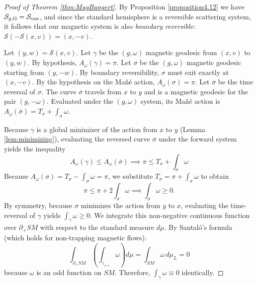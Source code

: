 \documentclass[12pt]{amsart}
\numberwithin{equation}{section}
\begin{document}
\begin{proof}[Proof of Theorem \ref{thm:MagBangert}] By Proposition \ref{proposition4.12} we have $\mathcal{S}_{g,\Omega} = \mathcal{S}_{\rm can}$, and since the standard hemisphere is a reversible scattering system, it follows that our magnetic system is also \emph{boundary reversible}: $\mathcal{S}(-\mathcal{S}(x,v)) = (x,-v)$.


Let $(y, w) = \mathcal{S}(x,v)$. Let $\gamma$ be the $(g,\omega)$ magnetic geodesic from $(x,v)$ to $(y,w)$. By hypothesis, $A_\omega(\gamma) = \pi$.
Let $\sigma$ be the $(g,\omega)$ magnetic geodesic starting from $(y, -w)$. By boundary reversibility, $\sigma$ must exit exactly at $(x, -v)$. By the hypothesis on the Ma\~n\'e action, $A_\omega(\sigma) = \pi$. Let $\overline{\sigma}$ be the time reversal of $\sigma$. The curve $\overline{\sigma}$ travels from $x$ to $y$ and is a magnetic geodesic for the pair $(g, -\omega)$. Evaluated under the
$(g, \omega)$ system, its Ma\~n\'e action is $A_\omega(\overline{\sigma}) = T_\sigma + \int_\sigma \omega$.

Because $\gamma$ is a global minimizer of the action from $x$ to $y$ (Lemma \ref{lem:minimizing}), evaluating the reversed curve $\overline{\sigma}$ under the forward system yields the inequality
\begin{equation*}
    A_\omega(\gamma) \le A_\omega(\overline{\sigma}) \implies \pi \le T_\sigma +\int_\sigma \omega
\end{equation*}
Because $A_\omega(\sigma) = T_\sigma - \int_\sigma \omega = \pi$, we substitute $T_\sigma = \pi +\int_\sigma \omega$ to obtain
\begin{equation*}
    \pi \le \pi +2\int_\sigma \omega \implies \int_\sigma \omega \geq 0.
\end{equation*}
By symmetry, because $\sigma$ minimizes the action from $y$ to $x$, evaluating the time-reversal of $\gamma$ yields $\int_\gamma \omega \geq 0$.
We integrate this non-negative continuous function over $\partial_+ SM$ with respect to the standard measure $d\mu$. By Santal\'o's formula (which holds for non-trapping magnetic flows):
\begin{equation*}
    \int_{\partial_+ SM} \left( \int_{\gamma_{x,v}} \omega \right) d\mu = \int_{SM} \omega \, d\mu_{L} = 0
\end{equation*}
because $\omega$ is an odd function on $SM$. Therefore, $\int_\gamma \omega \equiv 0$ identically.


\end{proof}
\end{document}
